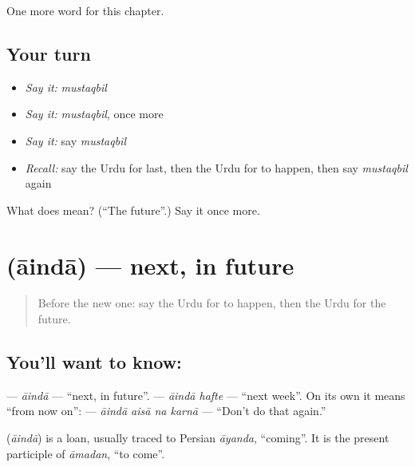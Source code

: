 \begin{grammarlens}[title={What you've built}]
One more word for this chapter.
\end{grammarlens}

\subsection*{Your turn}
\begin{itemize}
\raggedright
  \item \emph{Say it:} \emph{mustaqbil}
  \item \emph{Say it:} \emph{mustaqbil}, once more
  \item \emph{Say it:} say \emph{mustaqbil}
  \item \emph{Recall:} say the Urdu for last, then the Urdu for to happen, then say \emph{mustaqbil} again
\end{itemize}

\begin{tcolorbox}[breakable,colback=teal!4,colframe=teal!35!black,title={Before you move on}]
What does  mean? (\textquotedblleft{}The future\textquotedblright{}.) Say it once more.
\end{tcolorbox}
\section[\texorpdfstring{\ur{آئندہ} (āindā)}{آئندہ (āindā)}]{ (āindā) — next, in future}

\label{lesson:UR-C145-ainda}



\begin{quote}
Before the new one: say the Urdu for to happen, then the Urdu for the future.
\end{quote}

\subsection*{You'll want to know: }
\textbf{} — \emph{āindā} — \textquotedblleft{}next, in future\textquotedblright{}. \textbf{ } — \emph{āindā hafte} — \textquotedblleft{}next week\textquotedblright{}. On its own it means \textquotedblleft{}from now on\textquotedblright{}: \textbf{   } — \emph{āindā aisā na karnā} — \textquotedblleft{}Don't do that again.\textquotedblright{}

\begin{cousinweb}
\textbf{} (\emph{āindā}) is a loan, usually traced to Persian \emph{āyanda}, \textquotedblleft{}coming\textquotedblright{}. It is the present participle of \emph{āmadan}, \textquotedblleft{}to come\textquotedblright{}.
\end{cousinweb}

